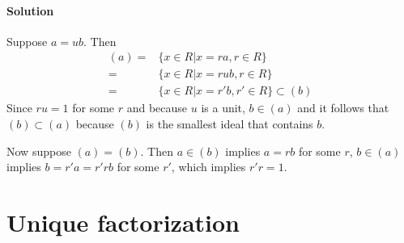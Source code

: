 \paragraph*{Solution}
Suppose $a = ub$. Then
\begin{align*}
(a) =& \{ x \in R | x = ra, r \in R \} \\
    =& \{ x \in R | x = rub, r \in R \} \\
    =& \{ x \in R | x = r'b, r' \in R \} \subset (b)
\end{align*}
Since $ru = 1$ for some $r$ and because $u$ is a unit, $b \in (a)$
and it follows that $(b) \subset (a)$ because $(b)$ is the smallest
ideal that contains $b$.

Now suppose $(a) = (b)$. Then $a \in (b)$ implies $a = rb$ for some
$r$, $b \in (a)$ implies $b = r'a = r'rb$ for some $r'$, which implies
$r'r = 1$.


\section{Unique factorization}

